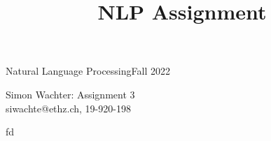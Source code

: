 \documentclass[a4paper,12pt]{ETHexercise}
\title{NLP Assignment}
\begin{document}


\newcommand{\pair}[2]{{\langle #1 , #2 \rangle}}
\newcommand{\score}[2]{\text{score}_{\theta}(\langle #1, #2 \rangle, \boldsymbol{w})}
\newcommand{\sscore}[1]{\text{score}_{\theta}(#1, \boldsymbol{w})}

{}
{\Large Natural Language Processing}{Fall 2022}
\begin{center}
	{\Huge Simon Wachter: Assignment 3}\\
	\quad\newline
	siwachte@ethz.ch, 19-920-198\\
	\quad\newline
	\timestamp
\end{center}
\begin{question}
	fd
\end{question}
\end{document}
